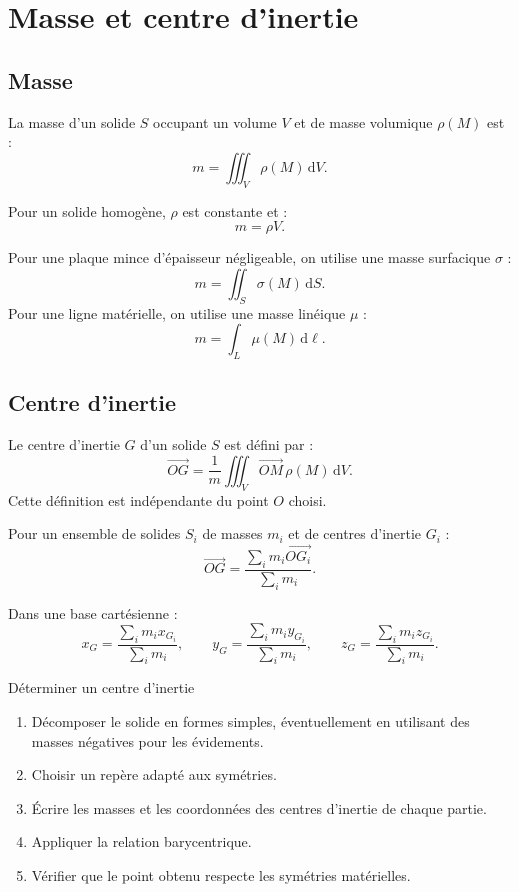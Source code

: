 
\section{Masse et centre d'inertie}

\subsection{Masse}

La masse d'un solide $S$ occupant un volume $V$ et de masse volumique $\rho(M)$ est :
\[
m=\iiint_V \rho(M)\,\mathrm dV.
\]

Pour un solide homogène, $\rho$ est constante et :
\[
m=\rho V.
\]

Pour une plaque mince d'épaisseur négligeable, on utilise une masse surfacique $\sigma$ :
\[
m=\iint_S \sigma(M)\,\mathrm dS.
\]
Pour une ligne matérielle, on utilise une masse linéique $\mu$ :
\[
m=\int_L \mu(M)\,\mathrm d\ell.
\]

\subsection{Centre d'inertie}

Le centre d'inertie $G$ d'un solide $S$ est défini par :
\[
\overrightarrow{OG}=\frac{1}{m}\iiint_V \overrightarrow{OM}\,\rho(M)\,\mathrm dV.
\]
Cette définition est indépendante du point $O$ choisi.

Pour un ensemble de solides $S_i$ de masses $m_i$ et de centres d'inertie $G_i$ :
\[
\overrightarrow{OG}=
\frac{\displaystyle\sum_i m_i\overrightarrow{OG_i}}
{\displaystyle\sum_i m_i}.
\]

Dans une base cartésienne :
\[
x_G=\frac{\sum_i m_i x_{G_i}}{\sum_i m_i},
\qquad
y_G=\frac{\sum_i m_i y_{G_i}}{\sum_i m_i},
\qquad z_G=\frac{\sum_i m_i z_{G_i}}{\sum_i m_i}.
\]

\begin{TLMethod}{Déterminer un centre d'inertie}
\begin{enumerate}
  \item Décomposer le solide en formes simples, éventuellement en utilisant des masses négatives pour les évidements.
  \item Choisir un repère adapté aux symétries.
  \item Écrire les masses et les coordonnées des centres d'inertie de chaque partie.
  \item Appliquer la relation barycentrique.
  \item Vérifier que le point obtenu respecte les symétries matérielles.
\end{enumerate}
\end{TLMethod}

